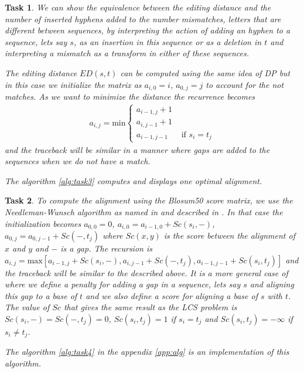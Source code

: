 \documentclass[11pt]{article} %
\theoremstyle{problemstyle}
\newtheorem{exercise}{Task}	%
\begin{document}
\begin{exercise} %
We can show the equivalence between the editing distance and the number of inserted hyphens added to the number mismatches, letters that are  different between sequences, by interpreting the action of adding an hyphen to a sequence, lets say $s$, as an insertion in this sequence or as a deletion in $t$ and interpreting a mismatch as a transform in either of these sequences.

The editing distance $ED(s,t)$ can be computed using the same idea of DP but in this case we initialize the matrix as $a_{i,0} = i$, $a_{0,j} = j$ to account for the not matches. As we want to minimize the distance the recurrence becomes
\begin{align*}
a_{i,j}=\text{min}
\begin{cases}
a_{i-1,j}+1 &\\
a_{i,j-1}+1 &\\
a_{i-1,j-1} &\text{ if } s_i=t_j
\end{cases}
\end{align*}
and the traceback will be similar in a manner where gaps are added to the sequences when we do not have a match. 

The algorithm \ref{alg:task3} computes and displays one optimal alignment.
 
\end{exercise}

\begin{exercise} %
	\begin{sloppypar}
To compute the alignment using the Blosum50 score matrix, we use the Needleman-Wunsch algorithm as named in \cite{durbin} and described in \cite{jones}. In that case the initialization becomes $a_{0,0}=0$, $a_{i,0} = a_{i-1,0} + Sc(s_i,-)$, $a_{0,j} = a_{0,j-1} + Sc(-,t_j)$ where $Sc(x,y)$ is the score between the alignment of $x$ and $y$ and $-$ is a gap. The recursion is ${
a_{i,j}=\text{max}[a_{i-1,j}+Sc(s_i,-), a_{i,j-1}+Sc(-,t_j),a_{i-1,j-1}+Sc(s_i,t_j)]}$
and the traceback will be similar to the described above. It is a more general case of  where we define a penalty for adding a gap in a sequence, lets say $s$ and aligning this gap to a base of $t$ and we also define a score for aligning a base of $s$ with $t$. The value of $Sc$ that gives the same result as the LCS problem is $Sc(s_i,-)=Sc(-,t_j)=0$, $Sc(s_i,t_j)=1$ if $s_i=t_j$ and $Sc(s_i,t_j)=-\infty$ if $s_i \neq t_j$.
	\end{sloppypar}
The algorithm \ref{alg:task4} in the appendix \ref{app:alg} is an implementation of this algorithm.

\end{exercise}
\end{document}
